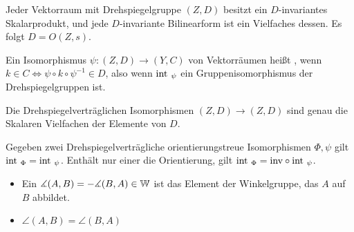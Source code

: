 \documentclass{article}
\renewcommand{\int}{\tn{int}~}
\begin{document}
	\begin{corollary}
		Jeder Vektorraum mit Drehspiegelgruppe $(Z,D)$ besitzt ein $D$-invariantes Skalarprodukt, und jede $D$-invariante Bilinearform ist ein Vielfaches dessen. Es folgt $D = O(Z,s)$.
	\end{corollary}
	\begin{definition}
		Ein Isomorphismus $\psi : (Z,D) \to (Y,C)$ von Vektorräumen heißt , wenn $k \in C \Leftrightarrow \psi \circ k \circ \psi^{-1} \in D$, also wenn $\int_\psi$ ein Gruppenisomorphismus der Drehspiegelgruppen ist.
	\end{definition}
	\begin{lemma}
		Die Drehspiegelverträglichen Isomorphismen $(Z,D) \to (Z,D)$ sind genau die Skalaren Vielfachen der Elemente von $D$.
	\end{lemma}
	\begin{lemma}
		Gegeben zwei Drehspiegelverträgliche orientierungstreue Isomorphismen $\Phi, \psi$ gilt $\int_\Phi = \int_\psi$. Enthält nur einer die Orientierung, gilt $\int_\Phi = \tn{inv} \circ \int_\psi$.
	\end{lemma}
	\begin{definition}
		\begin{itemize}
			\item Ein  $\measuredangle(A,B) = -\measuredangle(B,A)\in \mathbb{W}$ ist das Element der Winkelgruppe, das $A$ auf $B$ abbildet.
			\item 
			  $\angle(A,B) = \angle(B,A)$
		\end{itemize}
	\end{definition}
\end{document}
